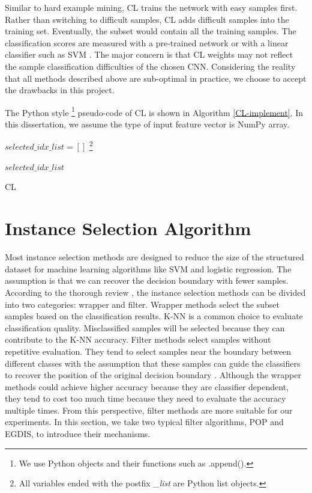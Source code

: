 Similar to hard example mining, CL trains the network with easy samples first. Rather than switching to difficult samples, CL adds difficult samples into the training set. Eventually, the subset would contain all the training samples. The classification scores are measured with a pre-trained network or with a linear classifier such as SVM \cite{Hacohen2019a}. The major concern is that CL weights may not reflect the sample classification difficulties of the chosen CNN. Considering the reality that all methods described above are sub-optimal in practice, we choose to accept the drawbacks in this project.

The Python style \footnote{We use Python objects and their functions such as .append().} pseudo-code of CL is shown in Algorithm \ref{CL-implement}. In this dissertation, we assume the type of input feature vector is NumPy array.  


\begin{algorithm}[H]
\label{CL-implement}

$selected\_idx\_list = []$ \footnote{All variables ended with the postfix \textit{\_list} are Python list objects.}\;



\Return $selected\_idx\_list$ \;

\caption{CL}
\end{algorithm}

\section{Instance Selection Algorithm}
Most instance selection methods are designed to reduce the size of the structured dataset for machine learning algorithms like SVM and logistic regression. The assumption is that we can recover the decision boundary with fewer samples. According to the thorough review \cite{Olvera-Lopez2010}, the instance selection methods can be divided into two categories: wrapper and filter. Wrapper methods select the subset samples based on the classification results. K-NN \cite{Aha1991} is a common choice to evaluate classification quality. Misclassified samples will be selected because they can contribute to the K-NN accuracy. Filter methods select samples without repetitive evaluation. They tend to select samples near the boundary between different classes with the assumption that these samples can guide the classifiers to recover the position of the original decision boundary \cite{Riquelme2003a, Malhat2020}.  Although the wrapper methods could achieve higher accuracy because they are classifier dependent, they tend to cost too much time because they need to evaluate the accuracy multiple times. From this perspective, filter methods are more suitable for our experiments. In this section, we take two typical filter algorithms, POP and EGDIS, to introduce their mechanisms.

